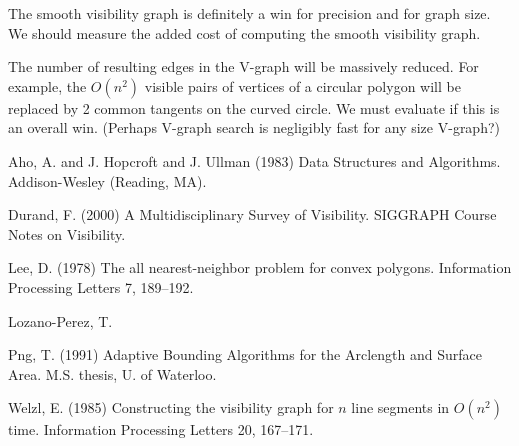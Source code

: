\documentclass[11pt,twocolumn]{article}
\begin{document}
The smooth visibility graph is definitely a win for precision
and for graph size.
We should measure the added cost of computing the smooth visibility graph.

The number of resulting edges in the V-graph will be massively reduced.
For example, the $O(n^2)$ visible pairs of vertices of a circular polygon
will be replaced by 2 common tangents on the curved circle.
We must evaluate if this is an overall win.
(Perhaps V-graph search is negligibly fast for any size V-graph?)


\begin{thebibliography}{Lozano-Perez 83}

Aho, A. and J. Hopcroft and J. Ullman (1983)
Data Structures and Algorithms.
Addison-Wesley (Reading, MA).

Durand, F. (2000)
A Multidisciplinary Survey of Visibility.
SIGGRAPH Course Notes on Visibility.

Lee, D. (1978)
The all nearest-neighbor problem for convex polygons.
Information Processing Letters 7, 189--192.

Lozano-Perez, T.

Png, T. (1991)
Adaptive Bounding Algorithms for the Arclength and Surface Area.
M.S. thesis, U. of Waterloo.

Welzl, E. (1985)
Constructing the visibility graph for $n$ line segments in $O(n^2)$ time.
Information Processing Letters 20, 167--171.

\end{thebibliography}
\end{document}
